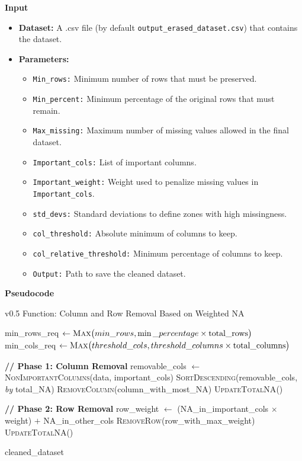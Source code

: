 \documentclass[a4paper,12pt]{article}
\begin{document}
\textbf{Input}
\begin{itemize}
    \item \textbf{Dataset:} A .csv file (by default \texttt{output\_erased\_dataset.csv}) that contains the dataset.
    \item \textbf{Parameters:}
    \begin{itemize}
        \item \texttt{Min\_rows:} Minimum number of rows that must be preserved.
        \item \texttt{Min\_percent:} Minimum percentage of the original rows that must remain.
        \item \texttt{Max\_missing:} Maximum number of missing values allowed in the final dataset.
        \item \texttt{Important\_cols:} List of important columns.
        \item \texttt{Important\_weight:} Weight used to penalize missing values in \texttt{Important\_cols}.
        \item \texttt{std\_devs:} Standard deviations to define zones with high missingness.
        \item \texttt{col\_threshold:} Absolute minimum of columns to keep.
        \item \texttt{col\_relative\_threshold:} Minimum percentage of columns to keep.
        \item \texttt{Output:} Path to save the cleaned dataset.
    \end{itemize}
\end{itemize}

\textbf{Pseudocode}
\begin{algorithm}[H]
\caption{v0.5 Function: Column and Row Removal Based on Weighted NA}
\begin{algorithmic}[1]
    \State min\_rows\_req $\gets \textsc{Max}\big(min\_rows, \min\_percentage \times \text{total\_rows}\big)$
    \State min\_cols\_req $\gets \textsc{Max}\big(threshold\_cols, \textstyle threshold\_columns \times \text{total\_columns}\big)$

    \State \textbf{// Phase 1: Column Removal}
    \State removable\_cols $\gets$ \textsc{NonImportantColumns}(data, important\_cols)
    \State \textsc{SortDescending}(removable\_cols, \textit{by} total\_NA)
        \State \textsc{RemoveColumn}(column\_with\_most\_NA)
        \State \textsc{UpdateTotalNA}()
    \EndWhile

    \State \textbf{// Phase 2: Row Removal}
        \State row\_weight $\gets$ (NA\_in\_important\_cols $\times$ weight) $+$ NA\_in\_other\_cols
        \State \textsc{RemoveRow}(row\_with\_max\_weight)
        \State \textsc{UpdateTotalNA}()
    \EndWhile

    \State \Return cleaned\_dataset
\EndFunction
\end{algorithmic}
\end{algorithm}
\end{document}
